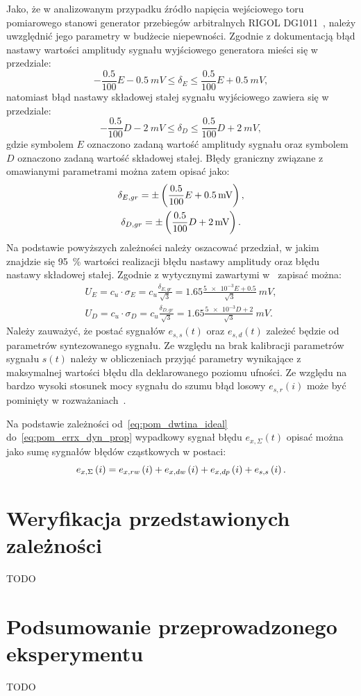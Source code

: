 Jako, że w analizowanym przypadku źródło napięcia wejściowego toru pomiarowego stanowi generator przebiegów arbitralnych RIGOL DG1011~\cite{rigol_fawg}, należy uwzględnić jego parametry w budżecie niepewności. Zgodnie z dokumentacją błąd nastawy wartości amplitudy sygnału wyjściowego generatora mieści się w przedziale:
\begin{equation}
-\frac{0.5}{100} E - \qty{0.5}{mV} \le \delta_{E} \le \frac{0.5}{100} E + \qty{0.5}{mV} \label{eq:pom_gen_amperr_range},
\end{equation}
natomiast błąd nastawy składowej stałej sygnału wyjściowego zawiera się w przedziale:
\begin{equation}
-\frac{0.5}{100} D - \qty{2}{mV} \le \delta_{D} \le \frac{0.5}{100} D + \qty{2}{mV} \label{eq:pom_gen_shferr_range},
\end{equation}
gdzie symbolem $E$ oznaczono zadaną wartość amplitudy sygnału oraz symbolem $D$ oznaczono zadaną wartość składowej stałej. Błędy graniczny związane z omawianymi parametrami można zatem opisać jako:
\begin{gather}
\delta_{E,gr} = \pm \left(\frac{0.5}{100} E + \qty{0.5}{mV}\right) \label{eq:pom_gen_amperr_max}, \\
\delta_{D,gr} = \pm \left(\frac{0.5}{100} D + \qty{2}{mV}\right) \label{eq:pom_gen_shferr_max}.
\end{gather}
Na podstawie powyższych zależności należy oszacować przedział, w jakim znajdzie się \qty{95}{\percent} wartości realizacji błędu nastawy amplitudy oraz błędu nastawy składowej stałej. Zgodnie z wytycznymi zawartymi w~\cite{jcgm_guide} zapisać można:
\begin{gather}
U_{E} = c_{u} \cdot \sigma_{E} = c_{u} \frac{\delta_{E,gr}}{\sqrt{3}} = 1.65 \frac{\num{5e-3}E + 0.5}{\sqrt{3}} ~\unit{mV} \label{eq:pom_gen_amperr_unc}, \\
U_{D} = c_{u} \cdot \sigma_{D} = c_{u} \frac{\delta_{D,gr}}{\sqrt{3}} = 1.65 \frac{\num{5e-3}D + 2}{\sqrt{3}} ~\unit{mV} \label{eq:pom_gen_shferr_unc}.
\end{gather}
Należy zauważyć, że postać sygnałów $e_{s,s}(t)$ oraz $e_{s,d}(t)$ zależeć będzie od parametrów syntezowanego sygnału. Ze względu na brak kalibracji parametrów sygnału $s(t)$ należy w obliczeniach przyjąć parametry wynikające z maksymalnej wartości błędu dla deklarowanego poziomu ufności. Ze względu na bardzo wysoki stosunek mocy sygnału do szumu błąd losowy $e_{s,r}(i)$ może być pominięty w rozważaniach~\cite{jcgm_guide}.

Na podstawie zależności od~\eqref{eq:pom_dwtina_ideal} do~\eqref{eq:pom_errx_dyn_prop} wypadkowy sygnał błędu $e_{x,\Sigma}(t)$ opisać można jako sumę sygnałów błędów cząstkowych w postaci:
\begin{equation}
e_{x,\Sigma} \left(i\right) = e_{x,rw} \left(i\right) + e_{x,dw} \left(i\right) + e_{x,dp} \left(i\right) + e_{s,s} \left(i\right) \label{eq:pom_errx_sum}.
\end{equation}

\section{Weryfikacja przedstawionych zależności}

TODO

\section{Podsumowanie przeprowadzonego eksperymentu}

TODO

